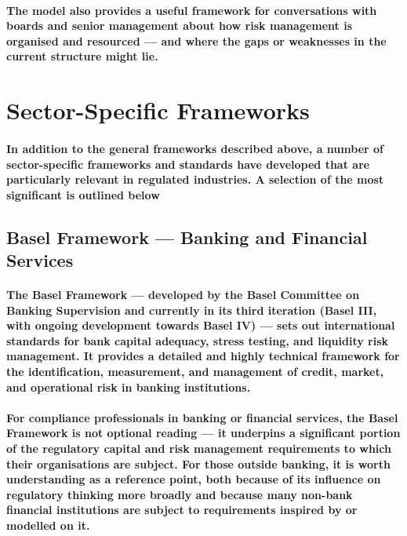 \paragraph{The model also provides a useful framework for conversations with boards and senior management about how risk management is organised and resourced — and where the gaps or weaknesses in the current structure might lie.}

\section{Sector-Specific Frameworks}
\paragraph{In addition to the general frameworks described above, a number of sector-specific frameworks and standards have developed that are particularly relevant in regulated industries. A selection of the most significant is outlined below}
\subsection{Basel Framework — Banking and Financial Services}
\paragraph{The \textbf{Basel Framework} — developed by the Basel Committee on Banking Supervision and currently in its third iteration (Basel III, with ongoing development towards Basel IV) — sets out international standards for bank capital adequacy, stress testing, and liquidity risk management. It provides a detailed and highly technical framework for the identification, measurement, and management of credit, market, and operational risk in banking institutions.}
\paragraph{For compliance professionals in banking or financial services, the Basel Framework is not optional reading — it underpins a significant portion of the regulatory capital and risk management requirements to which their organisations are subject. For those outside banking, it is worth understanding as a reference point, both because of its influence on regulatory thinking more broadly and because many non-bank financial institutions are subject to requirements inspired by or modelled on it.}
